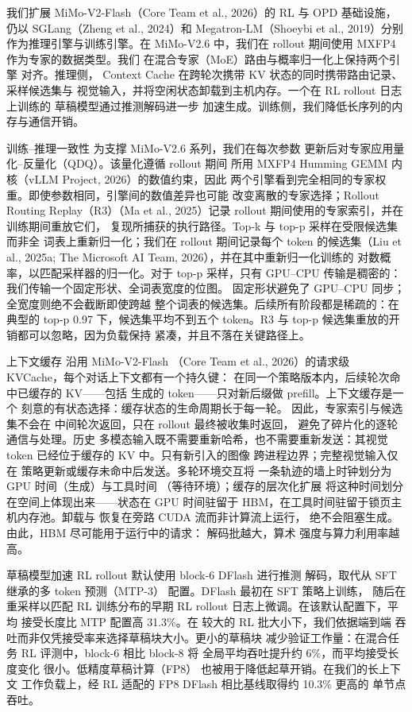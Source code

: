 \documentclass[
  10
]{article}
\begin{document}
我们扩展 MiMo-V2-Flash（Core Team et
al., 2026）的 RL 与 OPD 基础设施，仍以 SGLang（Zheng et al., 2024）和 Megatron-LM（Shoeybi
et al., 2019）分别作为推理引擎与训练引擎。在
MiMo-V2.6 中，我们在 rollout 期间使用 MXFP4 作为专家的数据类型。我们
在混合专家（MoE）路由与概率归一化上保持两个引擎
对齐。推理侧，
Context Cache 在跨轮次携带 KV 状态的同时携带路由记录、采样候选集与
视觉输入，并将空闲状态卸载到主机内存。一个在 RL rollout 日志上训练的
草稿模型通过推测解码进一步
加速生成。训练侧，我们降低长序列的内存与通信开销。

训练--推理一致性 为支撑 MiMo-V2.6 系列，我们在每次参数
更新后对专家应用量化--反量化（QDQ）。该量化遵循 rollout 期间
所用 MXFP4 Humming GEMM 内核（vLLM Project, 2026）的数值约束，因此
两个引擎看到完全相同的专家权重。即使参数相同，引擎间的数值差异也可能
改变离散的专家选择；Rollout Routing Replay（R3）（Ma et al., 2025）记录
rollout 期间使用的专家索引，并在训练期间重放它们，
复现所捕获的执行路径。Top-k 与 top-p 采样在受限候选集而非全
词表上重新归一化；我们在 rollout 期间记录每个 token 的候选集（Liu et
al., 2025a; The Microsoft AI Team, 2026），并在其中重新归一化训练的
对数概率，以匹配采样器的归一化。对于
top-p 采样，只有 GPU--CPU 传输是稠密的：我们传输一个固定形状、全词表宽度的位图。
固定形状避免了 GPU--CPU
同步；全宽度则绝不会截断即使跨越
整个词表的候选集。后续所有阶段都是稀疏的：在典型的 top-p
0.97 下，候选集平均不到五个 token。R3 与 top-p
候选集重放的开销都可以忽略，因为负载保持
紧凑，并且不落在关键路径上。

上下文缓存 沿用 MiMo-V2-Flash
（Core Team et al., 2026）的请求级 KVCache，每个对话上下文都有一个持久键：
在同一个策略版本内，后续轮次命中已缓存的 KV——包括
生成的 token——只对新后缀做 prefill。上下文缓存是一个
刻意的有状态选择：缓存状态的生命周期长于每一轮。
因此，专家索引与候选集不会在
中间轮次返回，只在 rollout 最终被收集时返回，
避免了碎片化的逐轮通信与处理。历史
多模态输入既不需要重新哈希，也不需要重新发送：其视觉
token 已经位于缓存的 KV 中。只有新引入的图像
跨进程边界；完整视觉输入仅在
策略更新或缓存未命中后发送。多轮环境交互将
一条轨迹的墙上时钟划分为 GPU 时间（生成）与工具时间
（等待环境）；缓存的层次化扩展
将这种时间划分在空间上体现出来——状态在
GPU 时间驻留于 HBM，在工具时间驻留于锁页主机内存池。卸载与
恢复在旁路 CUDA 流而非计算流上运行，
绝不会阻塞生成。由此，HBM 尽可能用于运行中的请求：
解码批越大，算术
强度与算力利用率越高。

草稿模型加速 RL rollout 默认使用 block-6 DFlash 进行推测
解码，取代从 SFT 继承的多 token 预测（MTP-3）
配置。DFlash 最初在 SFT 策略上训练，
随后在重采样以匹配
RL 训练分布的早期 RL rollout 日志上微调。在该默认配置下，平均
接受长度比 MTP 配置高 31.3\%。在
较大的 RL 批大小下，我们依据端到端
吞吐而非仅凭接受率来选择草稿块大小。更小的草稿块
减少验证工作量：在混合任务 RL 评测中，block-6 相比 block-8 将
全局平均吞吐提升约 6\%，而平均接受长度变化
很小。低精度草稿计算（FP8）
也被用于降低起草开销。在我们的长上下文
工作负载上，经 RL 适配的 FP8 DFlash 相比基线取得约 10.3\% 更高的
单节点吞吐。
\end{document}
